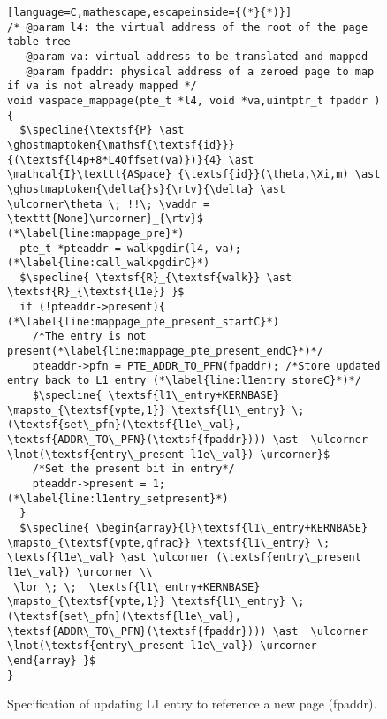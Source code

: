 \begin{figure}\footnotesize
  \begin{lstlisting}[language=C,mathescape,escapeinside={(*}{*)}]
/* @param l4: the virtual address of the root of the page table tree
   @param va: virtual address to be translated and mapped
   @param fpaddr: physical address of a zeroed page to map if va is not already mapped */
void vaspace_mappage(pte_t *l4, void *va,uintptr_t fpaddr ) {
  $\specline{\textsf{P} \ast \ghostmaptoken{\mathsf{\textsf{id}}}{(\textsf{l4p+8*L4Offset(va)})}{4} \ast \mathcal{I}\texttt{ASpace}_{\textsf{id}}(\theta,\Xi,m) \ast \ghostmaptoken{\delta{}s}{\rtv}{\delta} \ast \ulcorner\theta \; !!\; \vaddr = \texttt{None}\urcorner}_{\rtv}$ (*\label{line:mappage_pre}*)
  pte_t *pteaddr = walkpgdir(l4, va); (*\label{line:call_walkpgdirC}*)
  $\specline{ \textsf{R}_{\textsf{walk}} \ast \textsf{R}_{\textsf{l1e}} }$
  if (!pteaddr->present){ (*\label{line:mappage_pte_present_startC}*)
    /*The entry is not present(*\label{line:mappage_pte_present_endC}*)*/
    pteaddr->pfn = PTE_ADDR_TO_PFN(fpaddr); /*Store updated entry back to L1 entry (*\label{line:l1entry_storeC}*)*/
    $\specline{ \textsf{l1\_entry+KERNBASE} \mapsto_{\textsf{vpte,1}} \textsf{l1\_entry} \; (\textsf{set\_pfn}(\textsf{l1e\_val}, \textsf{ADDR\_TO\_PFN}(\textsf{fpaddr}))) \ast  \ulcorner \lnot(\textsf{entry\_present l1e\_val}) \urcorner}$
    /*Set the present bit in entry*/
    pteaddr->present = 1;(*\label{line:l1entry_setpresent}*)
  }
  $\specline{ \begin{array}{l}\textsf{l1\_entry+KERNBASE} \mapsto_{\textsf{vpte,qfrac}} \textsf{l1\_entry} \; \textsf{l1e\_val} \ast \ulcorner (\textsf{entry\_present l1e\_val}) \urcorner \\
 \lor \; \;  \textsf{l1\_entry+KERNBASE} \mapsto_{\textsf{vpte,1}} \textsf{l1\_entry} \; (\textsf{set\_pfn}(\textsf{l1e\_val}, \textsf{ADDR\_TO\_PFN}(\textsf{fpaddr}))) \ast  \ulcorner \lnot(\textsf{entry\_present l1e\_val}) \urcorner  \end{array} }$
}
\end{lstlisting}
\vspace{-2em}
  \caption{Specification of updating L1 entry to reference a new page (\textsf{fpaddr}).}
\label{fig:mapping_codeC}
\end{figure}


